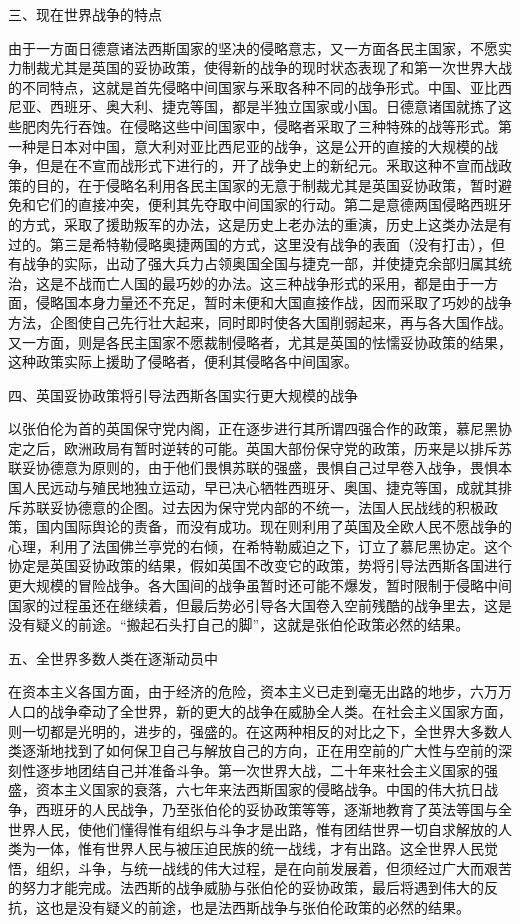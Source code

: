 三、现在世界战争的特点

由于一方面日德意诸法西斯国家的坚决的侵略意志，又一方面各民主国家，不愿实力制裁尤其是英国的妥协政策，使得新的战争的现时状态表现了和第一次世界大战的不同特点，这就是首先侵略中间国家与釆取各种不同的战争形式。中国、亚比西尼亚、西班牙、奥大利、捷克等国，都是半独立国家或小国。日德意诸国就拣了这些肥肉先行吞蚀。在侵略这些中间国家中，侵略者采取了三种特殊的战等形式。第一种是日本对中国，意大利对亚比西尼亚的战争，这是公开的直接的大规模的战争，但是在不宣而战形式下进行的，开了战争史上的新纪元。釆取这种不宣而战政策的目的，在于侵略名利用各民主国家的无意于制裁尤其是英国妥协政策，暂时避免和它们的直接冲突，便利其先夺取中间国家的行动。第二是意德两国侵略西班牙的方式，采取了援助叛军的办法，这是历史上老办法的重演，历史上这类办法是有过的。第三是希特勒侵略奥捷两国的方式，这里没有战争的表面（没有打击），但有战争的实际，出动了强大兵力占领奥国全国与捷克一部，并使捷克余部归属其统治，这是不战而亡人国的最巧妙的办法。这三种战争形式的采用，都是由于一方面，侵略国本身力量还不充足，暂时未便和大国直接作战，因而采取了巧妙的战争方法，企图使自己先行壮大起来，同时即时使各大国削弱起来，再与各大国作战。又一方面，则是各民主国家不愿裁制侵略者，尤其是英国的怯懦妥协政策的结果，这种政策实际上援助了侵略者，便利其侵略各中间国家。

四、英国妥协政策将引导法西斯各国实行更大规模的战争

以张伯伦为首的英国保守党内阁，正在逐步进行其所谓四强合作的政策，慕尼黑协定之后，欧洲政局有暂时逆转的可能。英国大部份保守党的政策，历来是以排斥苏联妥协德意为原则的，由于他们畏惧苏联的强盛，畏惧自己过早卷入战争，畏惧本国人民远动与殖民地独立运动，早已决心牺牲西班牙、奥国、捷克等国，成就其排斥苏联妥协德意的企图。过去因为保守党内部的不统一，法国人民战线的积极政策，国内国际舆论的责备，而没有成功。现在则利用了英国及全欧人民不愿战争的心理，利用了法国佛兰亭党的右倾，在希特勒威迫之下，订立了慕尼黑协定。这个协定是英国妥协政策的结果，假如英国不改变它的政策，势将引导法西斯各国进行更大规模的冒险战争。各大国间的战争虽暂时还可能不爆发，暂时限制于侵略中间国家的过程虽还在继续着，但最后势必引导各大国卷入空前残酷的战争里去，这是没有疑义的前途。“搬起石头打自己的脚”，这就是张伯伦政策必然的结果。

五、全世界多数人类在逐渐动员中

在资本主义各国方面，由于经济的危险，资本主义已走到毫无出路的地步，六万万人口的战争牵动了全世界，新的更大的战争在威胁全人类。在社会主义国家方面，则一切都是光明的，进步的，强盛的。在这两种相反的对比之下，全世界大多数人类逐渐地找到了如何保卫自己与解放自己的方向，正在用空前的广大性与空前的深刻性逐步地团结自己并准备斗争。第一次世界大战，二十年来社会主义国家的强盛，资本主义国家的衰落，六七年来法西斯国家的侵略战争。中国的伟大抗日战争，西班牙的人民战争，乃至张伯伦的妥协政策等等，逐渐地教育了英法等国与全世界人民，使他们懂得惟有组织与斗争才是出路，惟有团结世界一切自求解放的人类为一体，惟有世界人民与被压迫民族的统一战线，才有出路。这全世界人民觉悟，组织，斗争，与统一战线的伟大过程，是在向前发展着，但须经过广大而艰苦的努力才能完成。法西斯的战争威胁与张伯伦的妥协政策，最后将遇到伟大的反抗，这也是没有疑义的前途，也是法西斯战争与张伯伦政策的必然的结果。

